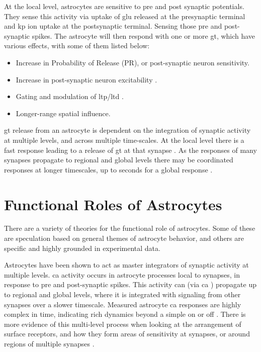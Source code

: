 \documentclass[conference]{IEEEtran}
\newcommand{\ca}{\gls{ca}\textrm{ }}
\newcommand{\kp}{\gls{kp}\textrm{ }}
\begin{document}
At the local level, astrocytes are sensitive to pre and post synaptic
potentials. They sense this activity via uptake of \gls{glu} released at the
presynaptic terminal and \kp ion uptake at the postsynaptic terminal. Sensing
those pre and post-synaptic spikes. The astrocyte will then respond with one or
more \gls{gt}, which have various effects, with some of them listed below:

\begin{itemize}
\item Increase in Probability of Release (PR), or post-synaptic neuron
  sensitivity.
\item Increase in post-synaptic neuron excitability \parencite{chung_2015}.
\item Gating and modulation of \gls{ltp}/\gls{ltd} \parencite{mederos_2018}.
\item Longer-range spatial influence.
\end{itemize}

\Gls{gt} release from an astrocyte is dependent on the integration of synaptic
activity at multiple levels, and across multiple time-scales. At the local level
there is a fast response leading to a release of \gls{gt} at that synapse
\parencite{pitta_2016}. As the responses of many synapses propagate to regional
and global levels there may be coordinated responses at longer timescales, up to
seconds for a global response \parencite{mederos_2018}.


\section{Functional Roles of Astrocytes}

There are a variety of theories for the functional role of astrocytes.
Some of these are speculation based on general themes of astrocyte behavior,
and others are specific and highly grounded in experimental data.

Astrocytes have been shown to act as master integrators of synaptic activity at
multiple levels. \ca activity occurs in astrocyte processes local to synapses,
in response to pre and post-synaptic spikes. This activity can (via \ca)
propagate up to regional and global levels, where it is integrated with
signaling from other synapses over a slower timescale. Measured astrocyte \ca
responses are highly complex in time, indicating rich dynamics beyond a simple
on or off \parencite{araque_2014}. There is more evidence of this multi-level
process when looking at the arrangement of surface receptors, and how they form
areas of sensitivity at synapses, or around regions of multiple synapses
\parencite{pitta_2012}.
\end{document}
